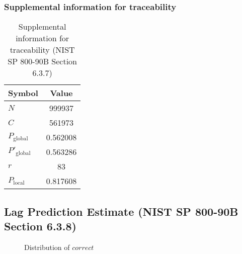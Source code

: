 \documentclass[a3paper,xelatex,english]{bxjsarticle}
\begin{document}
\subsubsection{Supplemental information for traceability}
\renewcommand{\arraystretch}{1.8}
\begin{table}[h]
\caption{Supplemental information for traceability (NIST SP 800-90B Section 6.3.7)}
\begin{center}
\begin{tabular}{|l|c|}
\hline 
\rowcolor{anotherlightblue} %
Symbol				& Value \\ \hline 
$N$				& 999937\\ \hline 
$C$				& 561973\\ \hline 
$P_{\textrm{global}}$				& 0.562008\\ \hline 
$P'_{\textrm{global}}$			& 0.563286\\ \hline 
$r$				& 83\\ \hline 
$P_{\textrm{local}}$ 			& 0.817608\\ \hline
\end{tabular}
\end{center}
\end{table}
\renewcommand{\arraystretch}{1.4}
\clearpage
\subsection{Lag Prediction Estimate (NIST SP 800-90B Section 6.3.8)}\label{sec:Binary638}

\begin{figure}[htbp]
\centering

\caption{Distribution of $correct$}
\end{figure}
\end{document}

